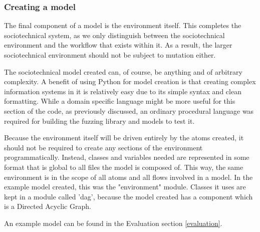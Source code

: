 \subsubsection{Creating a model}
The final component of a model is the environment itself. This completes the sociotechnical system, as we only distinguish between the sociotechnical environment and the workflow that exists within it. As a result, the larger sociotechnical environment should not be subject to mutation either. \par
The sociotechnical model created can, of course, be anything and of arbitrary complexity. A benefit of using Python for model creation is that creating complex information systems in it is relatively easy due to its simple syntax and clean formatting. While a domain specific language might be more useful for this section of the code, as previously discussed, an ordinary procedural language was required for building the fuzzing library and models to test it. \par
Because the environment itself will be driven entirely by the atoms created, it should not be required to create any sections of the environment programmatically. Instead, classes and variables needed are represented in some format that is global to all files the model is composed of. This way, the same environment is in the scope of all atoms and all flows involved in a model. In the example model created, this was the "environment" module. Classes it uses are kept in a module called 'dag', because the model created has a component which is a Directed Acyclic Graph. \par
An example model can be found in the Evaluation section \cref{evaluation}. \par

